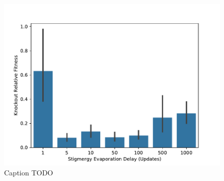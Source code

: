 \begin{figure}[!htbp]
\begin{center}
\includegraphics[width=\textwidth]{img/knockout_rel_fit_stig_delay.pdf}
\caption{
Caption TODO
}
\label{fig:knockout_rel_fit_stig_delay}
\end{center}
\end{figure}
